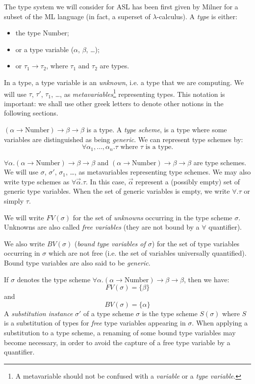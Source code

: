 The type system we will consider for ASL has been first given by
Milner \cite{Milner78} for a subset of the ML language (in fact, a
superset of $\lambda$-calculus).
A {\em type} is either:
\begin{itemize}
\item the type Number;
\item or a type variable ($\alpha$, $\beta$, \ldots);
\item or $\tau_1 \rightarrow \tau_2$, where $\tau_1$ and $\tau_2$ are types.
\end{itemize}
In a type, a type variable is an {\em unknown}, i.e. a type that we
are computing.  We will use $\tau$, $\tau'$, $\tau_1$, \ldots, as {\em
metavariables}\footnote{A metavariable should not be confused with a
{\em variable} or a {\em type variable}.} representing types. This
notation is important: we shall use other greek letters to denote
other notions in the following sections.

\Example
$(\alpha \rightarrow \mbox{Number}) \rightarrow \beta \rightarrow \beta$
is a type.
\End
%
A {\em type scheme}, is a type where some variables are distinguished as
being {\em generic}. We can represent type schemes by:
\[
\forall \alpha_1,  \ldots, \alpha_n . \tau \mbox{ where } \tau \mbox{ is a
type.}
\]

\Example
$\forall \alpha . (\alpha \rightarrow \mbox{Number}) \rightarrow \beta \rightarrow \beta$
and
$(\alpha \rightarrow \mbox{Number}) \rightarrow \beta \rightarrow \beta$
are type schemes.
\End
We will use $\sigma$, $\sigma'$, $\sigma_1$, \ldots, as metavariables
representing type schemes.
We may also write type schemes as $\forall
\vec{\alpha} . \tau$. In this case, $\vec{\alpha}$ represent a (possibly
empty) set of generic type variables. When the set of generic variables is
empty, we write $\forall . \tau$ or simply $\tau$.

We will write $FV(\sigma)$ for the set of {\em unknowns} occurring in the type
scheme $\sigma$. Unknowns are also called {\em free variables} (they are not
bound by a $\forall$ quantifier).
%
%

We also write $BV(\sigma)$ ({\em bound type variables of $\sigma$}) for the
set of type variables occurring in $\sigma$ which are not free (i.e.
the set of variables universally quantified). Bound type variables are
also said to be {\em generic}.

\Example
If $\sigma$ denotes the type scheme
$\forall \alpha . (\alpha \rightarrow \mbox{Number}) \rightarrow \beta \rightarrow \beta$,
then we have:
\[
FV(\sigma) = \{\beta\}
\]
and
\[
BV(\sigma) = \{\alpha\}
\]
\End
%
A {\em substitution instance} $\sigma'$ of a type scheme $\sigma$ is
the type scheme $S(\sigma)$ where $S$ is a substitution of types for
{\em free} type variables appearing in $\sigma$.
When applying a substitution to a type scheme, a renaming of some
bound type variables may become necessary, in order to avoid the capture
of a free type variable by a quantifier.

